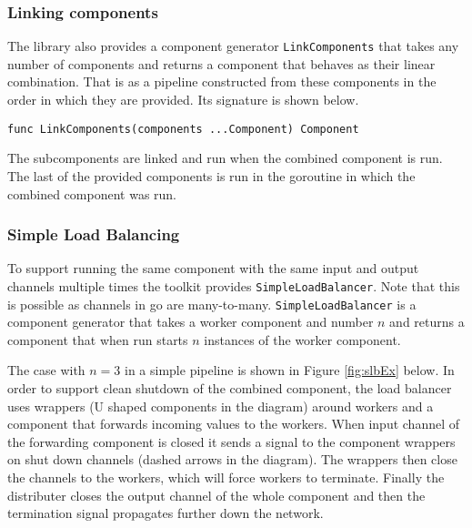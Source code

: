 \documentclass[12pt,a4paper]{article}
\begin{document}
\subsubsection{Linking components}
The library also provides a component generator \texttt{LinkComponents} that takes 
any number of components and returns a component that behaves as their 
linear combination. That is as a pipeline constructed from these components 
in the order in which they are provided. Its signature is shown below.
\begin{lstlisting}
func LinkComponents(components ...Component) Component
\end{lstlisting}
The subcomponents are linked and run when the combined component is run. 
The last of the provided components is run in the goroutine in which
the combined component was run.

\subsubsection{Simple Load Balancing}
To support running the same component with the same input and output 
channels multiple times the toolkit provides \texttt{SimpleLoadBalancer}.
Note that this is possible as channels in go are many-to-many.
\texttt{SimpleLoadBalancer} is a component generator that takes a worker 
component and number $n$ and returns a component that when run starts 
$n$ instances of the worker component. 

The case with $n=3$ in a simple pipeline is shown in Figure \ref{fig:slbEx} below. 
In order to support clean shutdown of the combined component, the load balancer uses 
wrappers (U shaped components in the diagram) around workers and a component that 
forwards incoming values to the workers. When input channel of the forwarding
component is closed it sends a signal to the component wrappers on shut 
down channels (dashed arrows in the diagram). The wrappers then close
the channels to the workers, which will force workers to terminate.
Finally the distributer closes the output channel of the whole component
and then the termination signal propagates further down the network.
\end{document}
